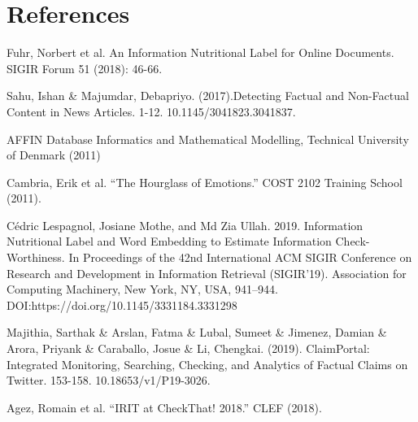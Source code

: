 \documentclass[10pt]{article}
\begin{document}
\section{References}
\begin{enumerate}[label={[\arabic*]}]
\item Fuhr, Norbert et al. \grqq{}An Information Nutritional Label for Online Documents.\grqq{} SIGIR Forum 51 (2018): 46-66.\label{[1]}
\item Sahu, Ishan \& Majumdar, Debapriyo. (2017).Detecting Factual and Non-Factual Content in News Articles. 1-12. 10.1145/3041823.3041837.\label{[2]}
\item AFFIN Database Informatics and Mathematical Modelling, Technical University of Denmark (2011) \label{[3]}
\item Cambria, Erik et al. “The Hourglass of Emotions.” COST 2102 Training School (2011). \label{[4]}
\item Cédric Lespagnol, Josiane Mothe, and Md Zia Ullah. 2019. Information Nutritional Label and Word Embedding to Estimate Information Check-Worthiness. In Proceedings of the 42nd International ACM SIGIR Conference on Research and Development in Information Retrieval (SIGIR’19). Association for Computing Machinery, New York, NY, USA, 941–944. DOI:https://doi.org/10.1145/3331184.3331298 \label{[5]}
\item Majithia, Sarthak \& Arslan, Fatma \& Lubal, Sumeet \& Jimenez, Damian \& Arora, Priyank \& Caraballo, Josue \& Li, Chengkai. (2019). ClaimPortal: Integrated Monitoring, Searching, Checking, and Analytics of Factual Claims on Twitter. 153-158. 10.18653/v1/P19-3026. \label{[6]}
\item Agez, Romain et al. “IRIT at CheckThat! 2018.” CLEF (2018). \label{[7]}



\end{enumerate}
\end{document}

